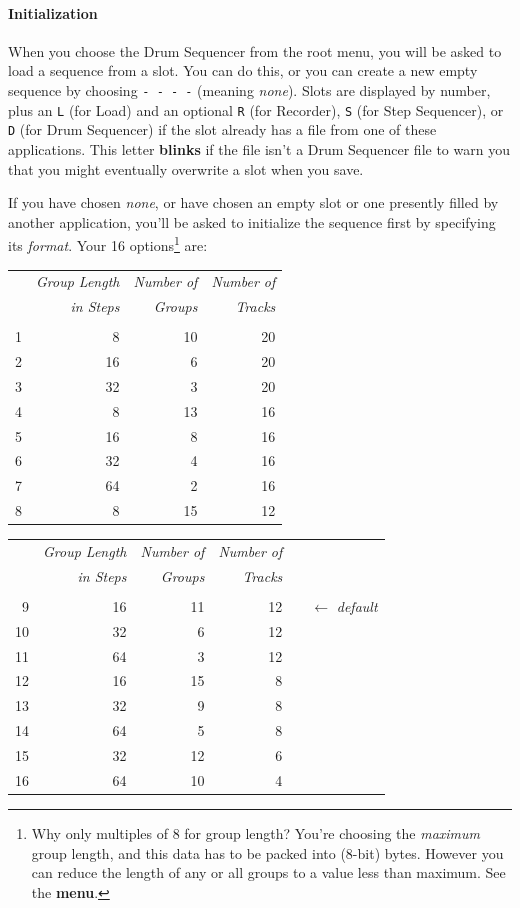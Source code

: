 \documentclass{article}
\begin{document}
\paragraph{Initialization} When you choose the Drum Sequencer from the root menu, you will be asked to load a sequence from a slot.  You can do this, or you can create a new empty sequence by choosing \texttt{-~-~-~-} (meaning {\it none}).  Slots are displayed by number, plus an \texttt{L} (for Load) and an optional \texttt{R} (for Recorder), \texttt{S} (for Step Sequencer), or \texttt{D} (for Drum Sequencer) if the slot already has a file from one of these applications.  This letter {\bf blinks} if the file isn't a Drum Sequencer file to warn you that you might eventually overwrite a slot when you save.

If you have chosen {\it none}, or have chosen an empty slot or one presently filled by another application, you'll be asked to initialize the sequence first by specifying its {\it format}.  Your 16 options\footnote{Why only multiples of 8 for group length?  You're choosing the {\it maximum} group length, and this data has to be packed into (8-bit) bytes.  However you can reduce the length of any or all groups to a value less than maximum.  See the \textbf{menu}.} are:

\vspace{0.5em}\begin{center}{\small\noindent\begin{tabular}{@{}rrrr@{}}
&\it Group Length&\it Number of&\it Number of\\
&\it in Steps&\it Groups&\it Tracks\\
\hline\\[-0.9em]
1&8&10&20\\
2&16&6&20\\
3&32&3&20\\
4&8&13&16\\
5&16&8&16\\
6&32&4&16\\
7&64&2&16\\
8&8&15&12\\
 \end{tabular}%
\hspace{8em}\begin{tabular}{@{}rrrr@{}r@{}}
&\it Group Length&\it Number of&\it Number of\\
&\it in Steps&\it Groups&\it Tracks\\
\cline{1-4}\\[-0.9em]
9&16&11&12&\ \ \(\longleftarrow\) {\it default}\\
10&32&6&12\\
11&64&3&12\\
12&16&15&8\\
13&32&9&8\\
14&64&5&8\\
15&32&12&6\\
16&64&10&4\\
 \end{tabular}}\end{center}
 \vspace{-0.5em}
 
\end{document}
